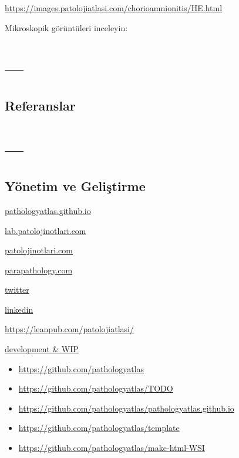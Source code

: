 \documentclass[
  letterpaper,
  DIV=11,
  numbers=noendperiod]{scrreprt}
\newlength{\cslhangindent}
\newlength{\cslentryspacingunit} %
\newenvironment{CSLReferences}[2] %
 {%
  \setlength{\parindent}{0pt}
  \ifodd #1
  \let\oldpar\par
  \def\par{\hangindent=\cslhangindent\oldpar}
  \fi
  \setlength{\parskip}{#2\cslentryspacingunit}
 }%
 {}
\begin{document}
\url{https://images.patolojiatlasi.com/chorioamnionitis/HE.html}

Mikroskopik görüntüleri inceleyin:

\part{---}


\hypertarget{referanslar}{%
\chapter*{Referanslar}\label{referanslar}}

\hypertarget{refs}{}
\begin{CSLReferences}{0}{0}
\end{CSLReferences}

\part{---}

\appendix
{}

\hypertarget{yuxf6netim-ve-geliux15ftirme}{%
\chapter{Yönetim ve Geliştirme}\label{yuxf6netim-ve-geliux15ftirme}}

\href{https://images.patolojiatlasi.com/}{pathologyatlas.github.io}

\href{https://lab.patolojinotlari.com}{lab.patolojinotlari.com}

\href{https://patolojinotlari.com}{patolojinotlari.com}

\href{https://parapathology.com}{parapathology.com}

\href{https://twitter.com/patolojinotlari}{twitter}

\href{https://www.linkedin.com/company/patoloji-notlari}{linkedin}

\url{https://leanpub.com/patolojiatlasi/}

\href{https://images.patolojiatlasi.com/development.md}{development \&
WIP}

\begin{itemize}
\item
  \url{https://github.com/pathologyatlas}
\item
  \url{https://github.com/pathologyatlas/TODO}
\item
  \url{https://github.com/pathologyatlas/pathologyatlas.github.io}
\item
  \url{https://github.com/pathologyatlas/template}
\item
  \url{https://github.com/pathologyatlas/make-html-WSI}
\end{itemize}
\end{document}
